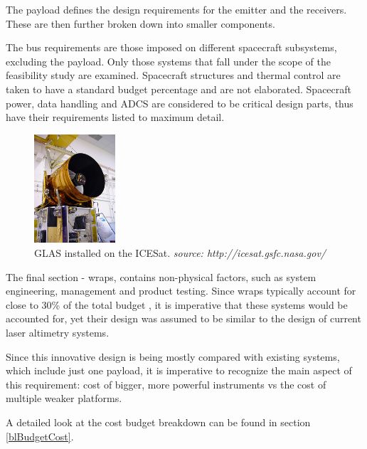 The payload defines the design requirements for the emitter and the receivers. These are then further broken down into smaller components.

The bus requirements are those imposed on different spacecraft subsystems, excluding the payload. Only those systems that fall under the scope of the feasibility study are examined. Spacecraft structures and thermal control are taken to have a standard budget percentage and are not elaborated. Spacecraft power, data handling and \ac{ADCS} are considered to be critical design parts, thus have their requirements listed to maximum detail.

\begin{figure}
 \vspace{0pt}
	\begin{center}
  \includegraphics[width=0.27\textwidth]{chapters/img/glas.jpg}
  \end{center}
  \vspace{-20pt}
  \caption{\small{\ac{GLAS} installed on the ICESat. \emph{source: http://icesat.gsfc.nasa.gov/}}}
  \label{fig:glas}
  \vspace{-50pt}
\end{figure}

The final section - wraps, contains non-physical factors, such as system engineering, management and product testing. Since wraps typically account for close to 30\% of the total budget \cite{larson}, it is imperative that these systems would be accounted for, yet their design was assumed to be similar to the design of current laser altimetry systems.

Since this innovative design is being mostly compared with existing systems, which include just one payload, it is imperative to recognize the main aspect of this requirement: cost of bigger, more powerful instruments vs the cost of multiple weaker platforms. 

A detailed look at the cost budget breakdown can be found in section \ref{blBudgetCost}.

